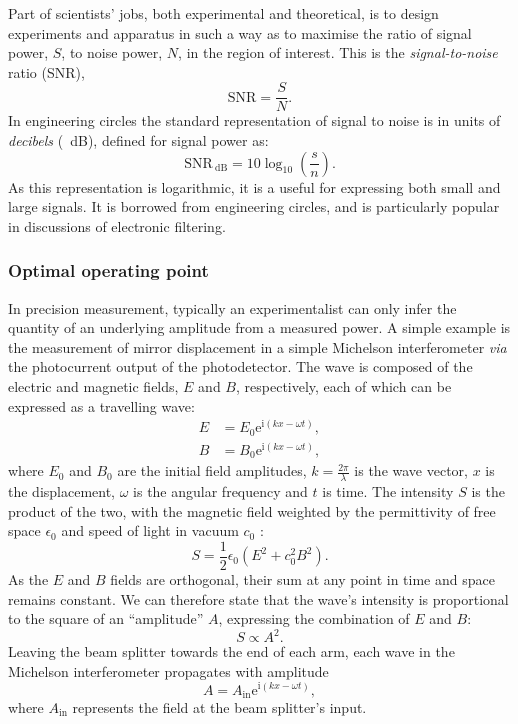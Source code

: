 Part of scientists' jobs, both experimental and theoretical, is to design experiments and apparatus in such a way as to maximise the ratio of signal power, $S$, to noise power, $N$, in the region of interest. This is the \emph{signal-to-noise} ratio (SNR),
\begin{equation}
  \text{SNR} = \frac{S}{N}.
\end{equation}
In engineering circles the standard representation of signal to noise is in units of \emph{decibels} (\SI{}{\deci\bel}), defined for signal power as:
\begin{equation}
  \text{SNR}_{\SI{}{\deci\bel}} = 10 \log_{10} \left( \frac{s}{n} \right).
\end{equation}
As this representation is logarithmic, it is a useful for expressing both small and large signals. It is borrowed from engineering circles, and is particularly popular in discussions of electronic filtering.

\subsubsection{Optimal operating point}

In precision measurement, typically an experimentalist can only infer the quantity of an underlying amplitude from a measured power. A simple example is the measurement of mirror displacement in a simple Michelson interferometer \emph{via} the photocurrent output of the photodetector. The wave is composed of the electric and magnetic fields, $E$ and $B$, respectively, each of which can be expressed as a travelling wave:
\begin{align}
  E &= E_0 \text{e}^{\text{i} \left( kx - \omega t \right)}, \\
  B &= B_0 \text{e}^{\text{i}  \left( kx - \omega t \right)},
\end{align}
where $E_0$ and $B_0$ are the initial field amplitudes, $k = \frac{2 \pi}{\lambda}$ is the wave vector, $x$ is the displacement, $\omega$ is the angular frequency and $t$ is time. The intensity $S$ is the product of the two, with the magnetic field weighted by the permittivity of free space $\epsilon_0$ and speed of light in vacuum $c_0$ :
\begin{equation}
  S = \frac{1}{2} \epsilon_0 \left( E^2 + c_0^2 B^2 \right).
\end{equation}
As the $E$ and $B$ fields are orthogonal, their sum at any point in time and space remains constant. We can therefore state that the wave's intensity is proportional to the square of an ``amplitude'' $A$, expressing the combination of $E$ and $B$:
\begin{equation}
  S \propto A^2.
\end{equation}
Leaving the beam splitter towards the end of each arm, each wave in the Michelson interferometer propagates with amplitude
\begin{equation}
  A = A_{\text{in}} \text{e}^{\text{i} \left( kx - \omega t \right)},
\end{equation}
where $A_{\text{in}}$ represents the field at the beam splitter's input.

